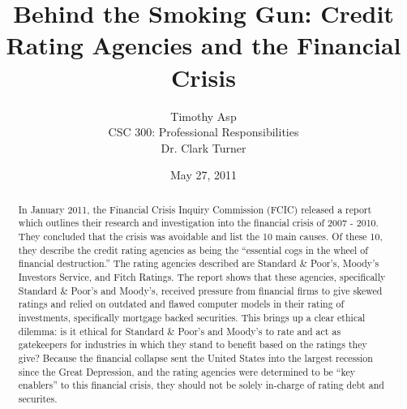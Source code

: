 \documentclass[11pt]{article}
\begin{document}
\title{\vfill Behind the Smoking Gun: Credit Rating Agencies and the Financial Crisis} %
\author{
Timothy Asp\vspace{10pt} \\
CSC 300: Professional Responsibilities\vspace{10pt} \\
Dr. Clark Turner\vspace{10pt} \\
}

\date{May 27, 2011}

\maketitle

\vfill
\begin{abstract}
In January 2011, the Financial Crisis Inquiry Commission (FCIC) released a report which outlines their research and investigation into the financial crisis of 2007 - 2010.  They concluded that the crisis was avoidable and list the 10 main causes.\cite[p.~417-418]{govtReport}  Of these 10, they describe the credit rating agencies as being the ``essential cogs in the wheel of financial destruction.''\cite[p.~xxv]{govtReport} The rating agencies described are Standard \& Poor's, Moody's Investors Service, and Fitch Ratings.  The report shows that these agencies, specifically Standard \& Poor's and Moody's, received pressure from financial firms to give skewed ratings \cite{ratingEthics, hRatingEthics} and relied on outdated and flawed computer models in their rating of investments, specifically mortgage backed securities. \cite[p.~xxv]{govtReport}  This brings up a clear ethical dilemma: is it ethical for Standard \& Poor's and Moody's to rate and act as gatekeepers for industries in which they stand to benefit based on the ratings they give?  Because the financial collapse sent the United States into the largest recession since the Great Depression, and the rating agencies were determined to be ``key enablers'' to this financial crisis, they should not be solely in-charge of rating debt and securites. 
\end{abstract}

\thispagestyle{empty} %
\newpage


\thispagestyle{empty}  %
\tableofcontents
\end{document}
